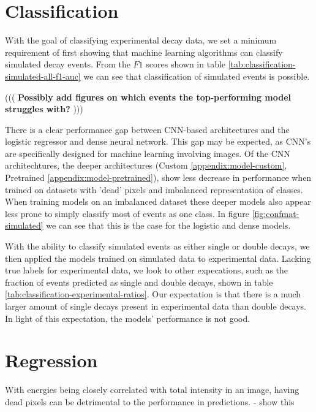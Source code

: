 \section{Classification}
With the goal of classifying experimental decay data, we set a minimum requirement
of first showing that machine learning algorithms can classify simulated decay events.
From the $F1$ scores shown in table \ref{tab:classification-simulated-all-f1-auc} we
can see that classification of simulated events is possible.

(((
    \textbf{Possibly add figures on which events the top-performing model struggles with?}
)))

There is a clear performance gap between CNN-based architectures and the logistic regressor and dense
neural network. This gap may be expected, as CNN's are specifically designed for
machine learning involving images. Of the CNN architechtures, the deeper architectures
(Custom \ref{appendix:model-custom}, Pretrained \ref{appendix:model-pretrained}),
show less decrease in performance when trained on datasets with 'dead' pixels and
imbalanced representation of classes. When training models on an imbalanced dataset
these deeper models also appear less prone to simply classify most of events as one
class. In figure \ref{fig:confmat-simulated} we can see that this is the case for
the logistic and dense models.

With the ability to classify simulated events as either single or double decays,
we then applied the models trained on simulated data to experimental data.
Lacking true labels for experimental data, we look to other expecations, such
as the fraction of events predicted as single and double decays, shown in table
\ref{tab:classification-experimental-ratios}. Our expectation is that there is
a much larger amount of single decays present in experimental data than
double decays. In light of this expectation, the models' performance is not good.


\section{Regression}
With energies being closely correlated with total intensity in an image,
having dead pixels can be detrimental to the performance in predictions.
- show this